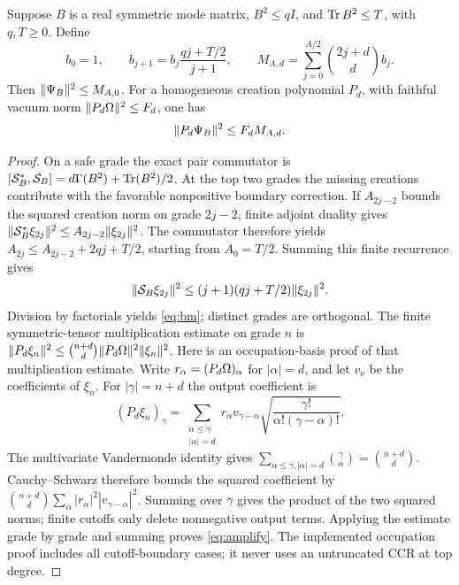 \begin{lemma}\label{lem:norm}
Suppose $B$ is a real symmetric mode matrix, $B^2\le qI$, and
$\operatorname{Tr} B^2\le T$, with $q,T\ge0$. Define
\begin{equation}\label{eq:bm}
 b_0=1,\qquad b_{j+1}=b_j\frac{qj+T/2}{j+1},\qquad
 M_{A,d}=\sum_{j=0}^{A/2}\binom{2j+d}{d}b_j.
\end{equation}
Then $\lVert \Psi_B\rVert^2\le M_{A,0}$. For a homogeneous creation polynomial
$P_d$, with faithful vacuum norm $\lVert P_d\Omega\rVert^2\le F_d$, one has
\begin{equation}\label{eq:amplify}
 \lVert P_d\Psi_B\rVert^2\le F_d M_{A,d}.
\end{equation}
\end{lemma}
\begin{proof}
On a safe grade the exact pair commutator is
$[\mathcal S_B^*,\mathcal S_B]=d\Gamma(B^2)+\operatorname{Tr}(B^2)/2$.
At the top two grades the missing creations contribute with the favorable
nonpositive boundary correction. If $A_{2j-2}$ bounds the squared creation
norm on grade $2j-2$, finite adjoint duality gives
$\lVert \mathcal S_B^*\xi_{2j}\rVert^2\le A_{2j-2}\lVert \xi_{2j}\rVert^2$.
The commutator therefore yields $A_{2j}\le A_{2j-2}+2qj+T/2$, starting
from $A_0=T/2$. Summing this finite recurrence gives
\[
 \lVert \mathcal S_B\xi_{2j}\rVert^2
       \le(j+1)(qj+T/2)\lVert \xi_{2j}\rVert^2.
\]
Division by factorials yields \eqref{eq:bm}; distinct grades are orthogonal.
The finite symmetric-tensor multiplication estimate on grade $n$ is
$\lVert P_d\xi_n\rVert^2\le\binom{n+d}{d}\lVert P_d\Omega\rVert^2\lVert \xi_n\rVert^2$.
Here is an occupation-basis proof of that multiplication estimate. Write
$r_\alpha=(P_d\Omega)_\alpha$ for $|\alpha|=d$, and let $v_\nu$ be the
coefficients of $\xi_n$. For $|\gamma|=n+d$ the output coefficient is
\[
 (P_d\xi_n)_\gamma=
 \sum_{\substack{\alpha\le\gamma\\|\alpha|=d}}
 r_\alpha v_{\gamma-\alpha}
 \sqrt{\frac{\gamma!}{\alpha!(\gamma-\alpha)!}}.
\]
The multivariate Vandermonde identity gives
$\sum_{\alpha\le\gamma,|\alpha|=d}\binom\gamma\alpha=\binom{n+d}{d}$.
Cauchy--Schwarz therefore bounds the squared coefficient by
$\binom{n+d}{d}\sum_\alpha|r_\alpha|^2|v_{\gamma-\alpha}|^2$.
Summing over $\gamma$ gives the product of the two squared norms; finite
cutoffs only delete nonnegative output terms. Applying the estimate grade by
grade and summing proves \eqref{eq:amplify}.
The implemented occupation proof includes all cutoff-boundary cases; it never
uses an untruncated CCR at top degree.
\end{proof}

